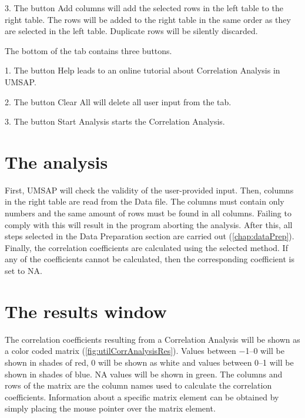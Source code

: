 \num{3}. The button Add columns will add the selected rows in the left table to
the right table. The rows will be added to the right table in the same order as
they are selected in the left table. Duplicate rows will be silently discarded.

The bottom of the tab contains three buttons.

\num{1}. The button Help leads to an online tutorial about Correlation Analysis in
UMSAP.

\num{2}. The button Clear All will delete all user input from the tab.

\num{3}. The button Start Analysis starts the Correlation Analysis.

\section{The analysis}

First, UMSAP will check the validity of the user-provided input. Then, columns in
the right table are read from the Data file. The columns must contain only numbers
and the same amount of rows must be found in all columns. Failing to comply with
this will result in the program aborting the analysis. After this, all steps selected
in the Data Preparation section are carried out (\autoref{chap:dataPrep}). Finally,
the correlation coefficients are calculated using the selected method. If any of
the coefficients cannot be calculated, then the corresponding coefficient is set to NA.

\section{The results window}

The correlation coefficients resulting from a Correlation Analysis will be shown
as a color coded matrix (\autoref{fig:utilCorrAnalysisRes}). Values between \numrange{-1}{0}
will be shown in shades of red, \num{0} will be shown as white and values between
\numrange{0}{1} will be shown in shades of blue. NA values will be shown in green.
The columns and rows of the matrix are the column names used to calculate the correlation
coefficients. Information about a specific matrix element can be obtained by simply
placing the mouse pointer over the matrix element.


